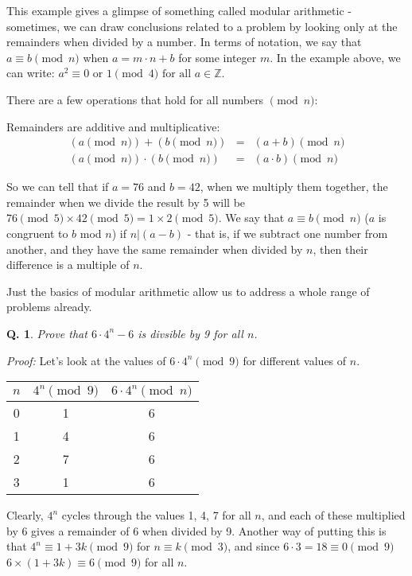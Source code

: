 \documentclass{article}
\newtheorem{question}{Q.}
\begin{document}
This example gives a glimpse of something called modular arithmetic - sometimes,
we can draw conclusions related to a problem by looking only at the remainders
when divided by a number. In terms of notation, we say that $a \equiv b \pmod{n}$
when $a = m\cdot n+b$ for some integer $m$. In the example above, we can write:
$a^2 \equiv 0 \text{ or } 1 \pmod{4} \text{ for all } a\in \mathbb{Z}$.

There are a few operations that hold for all numbers $\pmod{n}$:

Remainders are additive and multiplicative:
\begin{eqnarray*}
	(a\pmod{n}) + (b\pmod{n}) & = & (a+b)\pmod{n} \\
	(a\pmod{n}) \cdot (b\pmod{n}) & = & (a\cdot b) \pmod{n}
\end{eqnarray*}

So we can tell that if $a=76$ and $b=42$, when we multiply them together, the
remainder when we divide the result by 5 will be $76 \pmod{5} \times 42 \pmod{5}
= 1\times 2 \pmod{5}$. We say that $a \equiv b \pmod{n}$ ($a$ is congruent to $b$
mod $n$) if $n|(a-b)$ - that is, if we subtract one number from another, and they
have the same remainder when divided by $n$, then their difference is a multiple
of $n$.  

Just the basics of modular arithmetic allow us to address a whole range of problems already.

\begin{question}Prove that $6\cdot 4^n - 6$ is divsible by 9 for all $n$.\end{question}
\emph{Proof:} Let's look at the values of $6 \cdot 4^n \pmod{9}$ for different
values of $n$. 

\begin{table}[htb]
\begin{tabular}{|c|c|c|}
\hline
	$n$ & $4^n \pmod{9}$ & $6\cdot 4^n \pmod{n}$\\   
\hline 
	0 & 1 & 6 \\
	1 & 4 & 6 \\
	2 & 7 & 6 \\
	3 & 1 & 6 \\
\hline 
\end{tabular}
\end{table}

Clearly, $4^n$ cycles through the values 1, 4, 7 for all $n$, and each of these multiplied
by $6$ gives a remainder of 6 when divided by 9. Another way of putting this is that
$4^n \equiv 1 +3k \pmod{9}$ for $n\equiv k \pmod{3}$, and since $6\cdot 3 = 18 \equiv 0 \pmod{9}$
$6\times (1+3k) \equiv 6 \pmod{9}$ for all $n$.
\end{document}

